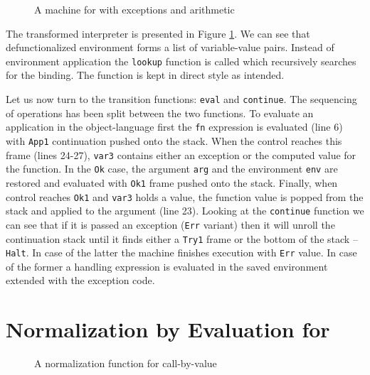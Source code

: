 \begin{figure}
  
  \caption{A machine for \LC{} with exceptions and arithmetic}
  \label{fig:studies-exceptions-machine}
\end{figure}

The transformed interpreter is presented in Figure \ref{fig:studies-exceptions-machine}.
We can see that defunctionalized environment forms a list of variable-value pairs.
Instead of environment application the \lstinline!lookup! function is called which recursively searches for the binding.
The function is kept in direct style as intended.

Let us now turn to the transition functions: \lstinline!eval! and \lstinline!continue!.
The sequencing of operations has been split between the two functions.
To evaluate an application in the object-language first the \lstinline!fn! expression is evaluated (line 6) with \lstinline!App1! continuation pushed onto the stack.
When the control reaches this frame (lines 24-27), \lstinline!var3! contains either an exception or the computed value for the function.
In the \lstinline!Ok! case, the argument \lstinline!arg! and the environment \lstinline!env! are restored and evaluated with \lstinline!Ok1! frame pushed onto the stack.
Finally, when control reaches \lstinline!Ok1! and \lstinline!var3! holds a value, the function value is popped from the stack and applied to the argument (line 23).
Looking at the \lstinline!continue! function we can see that if it is passed an exception (\lstinline!Err! variant) then it will unroll the continuation stack until it finds either a \lstinline!Try1! frame or the bottom of the stack -- \lstinline!Halt!.
In case of the latter the machine finishes execution with \lstinline!Err! value.
In case of the former a handling expression is evaluated in the saved environment extended with the exception code. 

\section{Normalization by Evaluation for \LC{}}

\begin{figure}
  
  \caption{A normalization function for call-by-value \LC{}}
  \label{fig:studies-nbe}
\end{figure}

